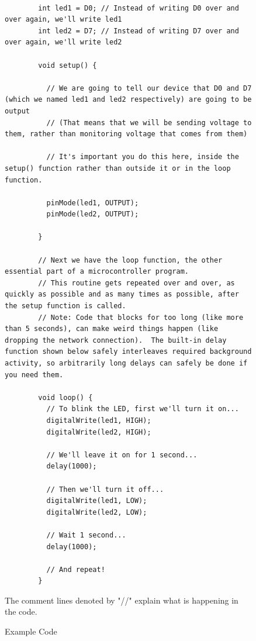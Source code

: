 \documentclass{article}
\begin{document}
\begin{figure}
    \begin{lstlisting}

        int led1 = D0; // Instead of writing D0 over and over again, we'll write led1
        int led2 = D7; // Instead of writing D7 over and over again, we'll write led2
        
        void setup() {
        
          // We are going to tell our device that D0 and D7 (which we named led1 and led2 respectively) are going to be output
          // (That means that we will be sending voltage to them, rather than monitoring voltage that comes from them)
        
          // It's important you do this here, inside the setup() function rather than outside it or in the loop function.
        
          pinMode(led1, OUTPUT);
          pinMode(led2, OUTPUT);
        
        }
        
        // Next we have the loop function, the other essential part of a microcontroller program.
        // This routine gets repeated over and over, as quickly as possible and as many times as possible, after the setup function is called.
        // Note: Code that blocks for too long (like more than 5 seconds), can make weird things happen (like dropping the network connection).  The built-in delay function shown below safely interleaves required background activity, so arbitrarily long delays can safely be done if you need them.
        
        void loop() {
          // To blink the LED, first we'll turn it on...
          digitalWrite(led1, HIGH);
          digitalWrite(led2, HIGH);
        
          // We'll leave it on for 1 second...
          delay(1000);
        
          // Then we'll turn it off...
          digitalWrite(led1, LOW);
          digitalWrite(led2, LOW);
        
          // Wait 1 second...
          delay(1000);
        
          // And repeat!
        }
    \end{lstlisting}
    \caption{Example Code} \label{fig:ExampleCode}
    \vspace{0.5cm}
    The comment lines denoted by "//" explain what is happening in the code.
\end{figure}
\end{document}
